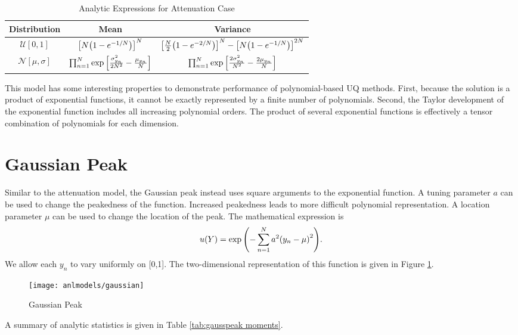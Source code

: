 \begin{table}[H]
  \centering
  \begin{tabular}{c|c|c}
    Distribution & Mean & Variance \\\hline
    $\mathcal{U}[0,1]$ & $\qty[N\qty(1-e^{-1/N})]^N$ & $\qty[\frac{N}{2}\qty(1-e^{-2/N})]^N -
                       \qty[N\qty(1-e^{-1/N})]^{2N}$ \\
    $\mathcal{N}[\mu,\sigma]$ & $\prod_{n=1}^N \exp\qty[\frac{\sigma_{y_n}^2}{2N^2}-\frac{\mu_{y_n}}{N}]$
    & $\prod_{n=1}^N \exp\qty[\frac{2\sigma_{y_n}^2}{N^2} - \frac{2\mu_{y_n}}{N}]$
  \end{tabular}
  \caption{Analytic Expressions for Attenuation Case}
  \label{tab:attenuation moments}
\end{table}

This model has some interesting properties to demonstrate performance of polynomial-based UQ methods.  First,
because the solution is a product of exponential functions, it cannot be exactly represented by a finite
number of polynomials.  Second, the Taylor development of the exponential function includes all increasing
polynomial orders.  The product of several exponential functions is effectively a tensor combination of
polynomials for each dimension.

\section{Gaussian Peak}\label{mod:gausspeak}
Similar to the attenuation model, the Gaussian peak \cite{sfugenz} instead uses square arguments to the
exponential function.  A tuning parameter $a$ can be used to change the peakedness of the
function.  Increased peakedness leads to more difficult polynomial representation.  
A location parameter $\mu$ can be used to change the location of the peak.
The mathematical expression is
\begin{equation}
  u(Y) = \exp\qty(-\sum_{n=1}^N a^2\qty(y_n-\mu)^2).
\end{equation}
We allow each $y_n$ to vary uniformly on [0,1].
The two-dimensional representation of this function is given in Figure \ref{fig: gauss peak}.
\begin{figure}[htb]
  \centering
  \texttt{[image: anlmodels/gaussian]}
  \caption{Gaussian Peak \cite{sfu}}
  \label{fig: gauss peak}
\end{figure}
A summary of analytic statistics is given in Table \ref{tab:gausspeak moments}.

